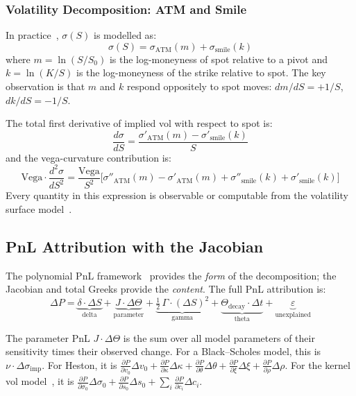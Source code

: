 \documentclass[11pt,a4paper]{article}
\begin{document}
\subsubsection{Volatility Decomposition: ATM and Smile}

In practice~\cite{pnl_total_gamma,total_gamma}, $\sigma(S)$ is modelled as:
\begin{equation}\label{eq:vol_decomp}
\sigma(S) = \sigma_{\text{ATM}}(m) + \sigma_{\text{smile}}(k)
\end{equation}
where $m = \ln(S/S_0)$ is the log-moneyness of spot relative to a pivot and $k = \ln(K/S)$ is the log-moneyness of the strike relative to spot.  The key observation is that $m$ and $k$ respond oppositely to spot moves: $dm/dS = +1/S$, $dk/dS = -1/S$.

The total first derivative of implied vol with respect to spot is:
\begin{equation}\label{eq:dsigma_dS}
\frac{d\sigma}{dS} = \frac{\sigma'_{\text{ATM}}(m) - \sigma'_{\text{smile}}(k)}{S}
\end{equation}
and the vega-curvature contribution is:
\begin{equation}\label{eq:vega_d2sigma}
\text{Vega} \cdot \frac{d^2\sigma}{dS^2} = \frac{\text{Vega}}{S^2}\bigl[\sigma''_{\text{ATM}}(m) - \sigma'_{\text{ATM}}(m) + \sigma''_{\text{smile}}(k) + \sigma'_{\text{smile}}(k)\bigr]
\end{equation}
Every quantity in this expression is observable or computable from the volatility surface model~\cite{implied_vol,implied_local_vol}.

\subsection{PnL Attribution with the Jacobian}
\label{sec:total-greeks-pnl}

The polynomial PnL framework~\cite{pnl_explain,pnl_total_gamma} provides the \emph{form} of the decomposition; the Jacobian and total Greeks provide the \emph{content}.  The full PnL attribution is:
\begin{equation}\label{eq:pnl-full}
\boxed{
\Delta P = \underbrace{\delta \cdot \Delta S}_{\text{delta}} + \underbrace{J \cdot \Delta\Theta}_{\text{parameter}} + \underbrace{\tfrac{1}{2}\,\Gamma \cdot (\Delta S)^2}_{\text{gamma}} + \underbrace{\Theta_{\text{decay}} \cdot \Delta t}_{\text{theta}} + \underbrace{\varepsilon}_{\text{unexplained}}
}
\end{equation}

The parameter PnL $J \cdot \Delta\Theta$ is the sum over all model parameters of their sensitivity times their observed change.  For a Black--Scholes model, this is $\nu \cdot \Delta\sigma_{\mathrm{imp}}$.  For Heston, it is $\frac{\partial P}{\partial v_0}\Delta v_0 + \frac{\partial P}{\partial \kappa}\Delta\kappa + \frac{\partial P}{\partial \theta}\Delta\theta + \frac{\partial P}{\partial \xi}\Delta\xi + \frac{\partial P}{\partial \rho}\Delta\rho$.  For the kernel vol model~\cite{implied_vol}, it is $\frac{\partial P}{\partial \sigma_0}\Delta\sigma_0 + \frac{\partial P}{\partial s_0}\Delta s_0 + \sum_i \frac{\partial P}{\partial c_i}\Delta c_i$.
\end{document}

